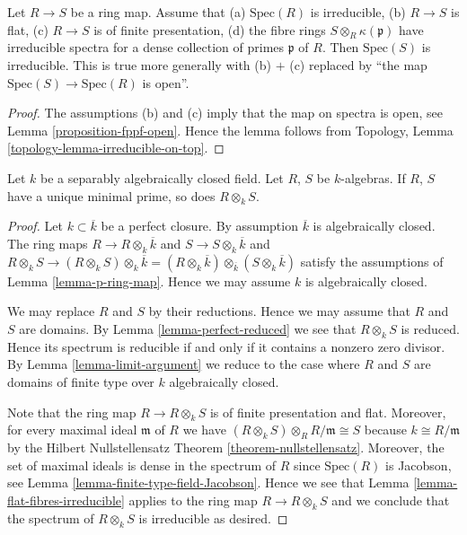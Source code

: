 \begin{lemma}
\label{lemma-flat-fibres-irreducible}
Let $R \to S$ be a ring map. Assume that (a) $\text{Spec}(R)$ is irreducible,
(b) $R \to S$ is flat, (c) $R \to S$ is of finite presentation,
(d) the fibre rings $S \otimes_R \kappa(\mathfrak p)$ have irreducible spectra
for a dense collection of primes $\mathfrak p$ of $R$. Then $\text{Spec}(S)$
is irreducible. This is true more generally with
(b) $+$ (c) replaced by ``the map $\text{Spec}(S) \to \text{Spec}(R)$ is
open''.
\end{lemma}

\begin{proof}
The assumptions (b) and (c) imply that the map on spectra is open,
see Lemma \ref{proposition-fppf-open}. Hence the lemma follows from
Topology, Lemma \ref{topology-lemma-irreducible-on-top}.
\end{proof}

\begin{lemma}
\label{lemma-separably-closed-irreducible}
Let $k$ be a separably algebraically closed field.
Let $R$, $S$ be $k$-algebras. If $R$, $S$ have a unique
minimal prime, so does $R \otimes_k S$.
\end{lemma}

\begin{proof}
Let $k \subset \overline{k}$ be a perfect closure.
By assumption $\overline{k}$ is algebraically closed.
The ring maps $R \to R\otimes_k \overline{k}$ and
$S \to S \otimes_k \overline{k}$ and
$R \otimes_k S \to (R \otimes_k S) \otimes_k \overline{k}
= (R \otimes_k \overline{k}) \otimes_{\overline{k}} (S \otimes_k \overline{k})$
satisfy the assumptions of Lemma \ref{lemma-p-ring-map}.
Hence we may assume $k$ is algebraically closed.

\medskip\noindent
We may replace $R$ and $S$ by their reductions.
Hence we may assume that $R$ and $S$ are domains.
By Lemma \ref{lemma-perfect-reduced} we see that $R \otimes_k S$ is
reduced. Hence its spectrum is reducible if and only if it contains a nonzero
zero divisor. By Lemma \ref{lemma-limit-argument} we reduce to the case where
$R$ and $S$ are domains of finite type over $k$ algebraically closed.

\medskip\noindent
Note that the ring map $R \to R \otimes_k S$ is of finite
presentation and flat. Moreover, for every maximal ideal
$\mathfrak m$ of $R$ we have
$(R \otimes_k S) \otimes_R R/\mathfrak m \cong S$ because
$k \cong R/\mathfrak m$ by the Hilbert Nullstellensatz Theorem
\ref{theorem-nullstellensatz}. Moreover, the set of
maximal ideals is dense in the spectrum of $R$ since
$\text{Spec}(R)$ is Jacobson, see Lemma \ref{lemma-finite-type-field-Jacobson}.
Hence we see that Lemma \ref{lemma-flat-fibres-irreducible} applies
to the ring map $R \to R \otimes_k S$ and we conclude that
the spectrum of $R \otimes_k S$ is irreducible as desired.
\end{proof}




















